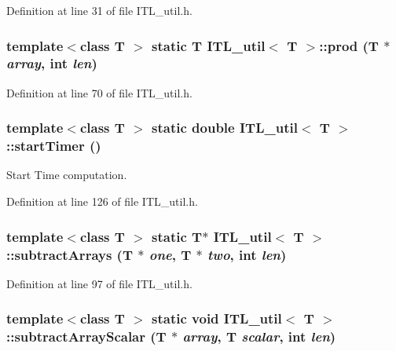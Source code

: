 Definition at line 31 of file ITL\_\-util.h.

\hypertarget{classITL__util_a9d64af43f6c6d4ebbbb794c6a95c12d6}{
\subsubsection[{prod}]{\setlength{\rightskip}{0pt plus 5cm}template$<$class T $>$ static T {\bf ITL\_\-util}$<$ T $>$::prod (T $\ast$ {\em array}, \/  int {\em len})}}
\label{classITL__util_a9d64af43f6c6d4ebbbb794c6a95c12d6}


Definition at line 70 of file ITL\_\-util.h.

\hypertarget{classITL__util_a46636a5a7bb9b109b342e403825c8ea9}{
\subsubsection[{startTimer}]{\setlength{\rightskip}{0pt plus 5cm}template$<$class T $>$ static double {\bf ITL\_\-util}$<$ T $>$::startTimer ()}}
\label{classITL__util_a46636a5a7bb9b109b342e403825c8ea9}


Start Time computation. 



Definition at line 126 of file ITL\_\-util.h.

\hypertarget{classITL__util_af3fcfd1766bf96813b009adc8abb5a7b}{
\subsubsection[{subtractArrays}]{\setlength{\rightskip}{0pt plus 5cm}template$<$class T $>$ static T$\ast$ {\bf ITL\_\-util}$<$ T $>$::subtractArrays (T $\ast$ {\em one}, \/  T $\ast$ {\em two}, \/  int {\em len})}}
\label{classITL__util_af3fcfd1766bf96813b009adc8abb5a7b}


Definition at line 97 of file ITL\_\-util.h.

\hypertarget{classITL__util_a447741f40abd631431a41ff21a3f77b8}{
\subsubsection[{subtractArrayScalar}]{\setlength{\rightskip}{0pt plus 5cm}template$<$class T $>$ static void {\bf ITL\_\-util}$<$ T $>$::subtractArrayScalar (T $\ast$ {\em array}, \/  T {\em scalar}, \/  int {\em len})}}
\label{classITL__util_a447741f40abd631431a41ff21a3f77b8}


